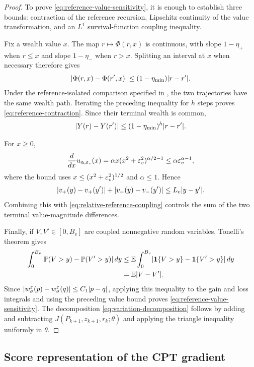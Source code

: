 \begin{proof}
To prove \eqref{eq:reference-value-sensitivity}, it is enough to establish three bounds: contraction of the reference recursion, Lipschitz continuity of the value transformation, and an $L^1$ survival-function coupling inequality.

Fix a wealth value $x$.  The map $r\mapsto\Phi(r,x)$ is continuous, with slope $1-\eta_+$ when $r\le x$ and slope $1-\eta_-$ when $r>x$.  Splitting an interval at $x$ when necessary therefore gives
\[
 \lvert\Phi(r,x)-\Phi(r',x)\rvert
 \le(1-\eta_{\min})\lvert r-r'\rvert.
\]
Under the reference-isolated comparison specified in , the two trajectories have the same wealth path.  Iterating the preceding inequality for $h$ steps proves \eqref{eq:reference-contraction}.  Since their terminal wealth is common,
\begin{equation}\label{eq:relative-reference-coupling}
 \lvert Y(r)-Y(r')\rvert
 \le(1-\eta_{\min})^h\lvert r-r'\rvert.
\end{equation}

For $x\ge0$,
\[
 \frac{d}{dx}u_{\alpha,\varepsilon_v}(x)
 =\alpha x(x^2+\varepsilon_v^2)^{\alpha/2-1}
 \le\alpha\varepsilon_v^{\alpha-1},
\]
where the bound uses $x\le(x^2+\varepsilon_v^2)^{1/2}$ and $\alpha\le1$.  Hence
\[
 \lvert v_+(y)-v_+(y')\rvert
 +\lvert v_-(y)-v_-(y')\rvert
 \le L_v\lvert y-y'\rvert.
\]
Combining this with \eqref{eq:relative-reference-coupling} controls the sum of the two terminal value-magnitude differences.

Finally, if $V,V'\in[0,B_v]$ are coupled nonnegative random variables, Tonelli's theorem gives
\begin{align*}
 \int_0^{B_v}\lvert\mathbb P(V>y)-\mathbb P(V'>y)\rvert\,dy
 &\le \mathbb E\int_0^{B_v}
 \lvert\mathbf 1\{V>y\}-\mathbf 1\{V'>y\}\rvert\,dy\\
 &=\mathbb E\lvert V-V'\rvert.
\end{align*}
Since $\lvert w_\sigma^\varepsilon(p)-w_\sigma^\varepsilon(q)\rvert\le C_1\lvert p-q\rvert$, applying this inequality to the gain and loss integrals and using the preceding value bound proves \eqref{eq:reference-value-sensitivity}.  The decomposition \eqref{eq:variation-decomposition} follows by adding and subtracting $J(P_{k+1},z_{k+1},r_k;\theta)$ and applying the triangle inequality uniformly in $\theta$.
\end{proof}

\subsection{Score representation of the CPT gradient}

